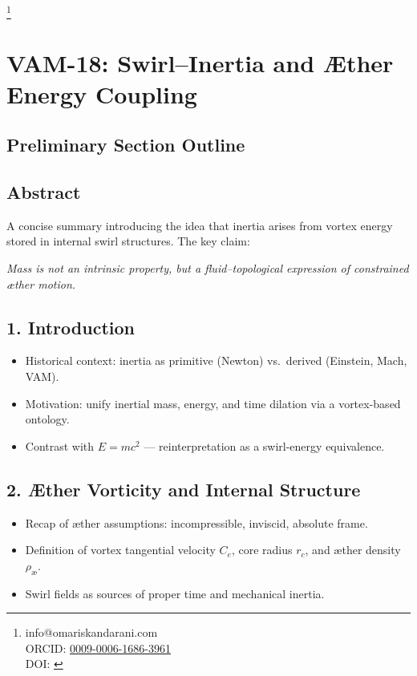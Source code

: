 \documentclass[twocolumn,aps,pre,floatfix,nofootinbib]{revtex4-2}
\begin{document}
    \title{\papertitle}
    \author{Omar Iskandarani}
    \thanks{info@omariskandarani.com \\
    ORCID: \href{https://orcid.org/0009-0006-1686-3961}{0009-0006-1686-3961} \\
    DOI: \href{https://doi.org/\paperdoi}{\paperdoi}
    }
    \date{\today}

\section*{VAM-18: Swirl--Inertia and Æther Energy Coupling}

\subsection*{Preliminary Section Outline}

\subsection*{Abstract}

A concise summary introducing the idea that inertia arises from vortex energy stored in internal swirl structures. The key claim:

\textit{Mass is not an intrinsic property, but a fluid--topological expression of constrained æther motion.}

\subsection*{1. Introduction}

\begin{itemize}
    \item Historical context: inertia as primitive (Newton) vs.\ derived (Einstein, Mach, VAM).
    \item Motivation: unify inertial mass, energy, and time dilation via a vortex-based ontology.
    \item Contrast with $E=mc^2$ --- reinterpretation as a swirl-energy equivalence.
\end{itemize}

\subsection*{2. Æther Vorticity and Internal Structure}

\begin{itemize}
    \item Recap of æther assumptions: incompressible, inviscid, absolute frame.
    \item Definition of vortex tangential velocity $C_e$, core radius $r_c$, and æther density $\rho_\text{\ae}$.
    \item Swirl fields as sources of proper time and mechanical inertia.
\end{itemize}
\end{document}
